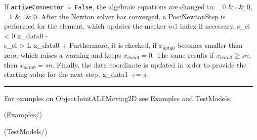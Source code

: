     \noindent If \texttt{activeConnector = False}, the algebraic equations are changed to:
    \bea
      \lambda_0 &=& 0,   \\
      \lambda_1 &=& 0.
    \eea   
%
    After the Newton solver has converged, a PostNewtonStep is performed for the element, which
    updates the marker $m1$ index if necessary.
    \bea
      s_{el} < 0 \quad \ra \quad x_{data0} \;-\! \nonumber\\
      s_{el} > L \quad \ra \quad x_{data0} \;+\!
    \eea
    Furthermore, it is checked, if $x_{data0}$ becomes smaller than zero, which raises a warning and keeps $x_{data0}=0$.
    The same results if $x_{data0}\ge sn$, then $x_{data0} = sn$.
    Finally, the data coordinate is updated in order to provide the starting value for the next step,
    \be
      x_{data1} \;+\!\!= s.
    \ee
%
\vspace{6pt}\par\noindent\rule{\textwidth}{0.4pt}
%
\noindent For examples on ObjectJointALEMoving2D see Examples and TestModels:
\bi
\item {} (Examples/)
\item {} (TestModels/)
\ei

%

\newpage

